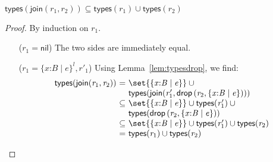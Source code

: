 \documentclass[9pt]{extarticle}
\newcommand{\ottnt}[1]{\mathit{#1}}
\newcommand{\ottsym}[1]{#1}
\begin{document}
\begin{lemma}
  \label{lem:typescoercion}
  ~
  
  \noindent
  $  \mathsf{types} (  \mathsf{join} ( \ottnt{r_{{\mathrm{1}}}} , \ottnt{r_{{\mathrm{2}}}} )  )   \subseteq    \mathsf{types} ( \ottnt{r_{{\mathrm{1}}}} )   \cup   \mathsf{types} ( \ottnt{r_{{\mathrm{2}}}} )   $
\begin{proof}
    By induction on $\ottnt{r_{{\mathrm{1}}}}$.
\begin{itemize}
      \item[($\ottnt{r_{{\mathrm{1}}}}  \ottsym{=}  \mathsf{nil}$)] The two sides are immediately equal.
      \item[($\ottnt{r_{{\mathrm{1}}}}  \ottsym{=}    \{ \mathit{x} \mathord{:} \ottnt{B} \mathrel{\mid} \ottnt{e} \}^{ \ottnt{l} }  , \ottnt{r'_{{\mathrm{1}}}} $)] Using
        Lemma~\ref{lem:typesdrop}, we find:
\[ \begin{array}{r@{~}c@{~}l}
           \mathsf{types} (  \mathsf{join} ( \ottnt{r_{{\mathrm{1}}}} , \ottnt{r_{{\mathrm{2}}}} )  )  &=&   \set{   \{ \mathit{x} \mathord{:} \ottnt{B} \mathrel{\mid} \ottnt{e} \}   }   \cup  {} \\  &  &   \mathsf{types} (  \mathsf{join} ( \ottnt{r'_{{\mathrm{1}}}} , \mathsf{drop} \, \ottsym{(}  \ottnt{r_{{\mathrm{2}}}}  \ottsym{,}   \{ \mathit{x} \mathord{:} \ottnt{B} \mathrel{\mid} \ottnt{e} \}   \ottsym{)} )  )   \\
          &\subseteq&    \set{   \{ \mathit{x} \mathord{:} \ottnt{B} \mathrel{\mid} \ottnt{e} \}   }   \cup   \mathsf{types} ( \ottnt{r'_{{\mathrm{1}}}} )    \cup  {} \\  &  &   \mathsf{types} ( \mathsf{drop} \, \ottsym{(}  \ottnt{r_{{\mathrm{2}}}}  \ottsym{,}   \{ \mathit{x} \mathord{:} \ottnt{B} \mathrel{\mid} \ottnt{e} \}   \ottsym{)} )   \\
          &\subseteq&    \set{   \{ \mathit{x} \mathord{:} \ottnt{B} \mathrel{\mid} \ottnt{e} \}   }   \cup   \mathsf{types} ( \ottnt{r'_{{\mathrm{1}}}} )    \cup   \mathsf{types} ( \ottnt{r_{{\mathrm{2}}}} )   \\
          &=&    \mathsf{types} ( \ottnt{r_{{\mathrm{1}}}} )   \cup   \mathsf{types} ( \ottnt{r_{{\mathrm{2}}}} )  
        \end{array} \]
    \end{itemize}
  \end{proof}
\end{lemma}
\end{document}

